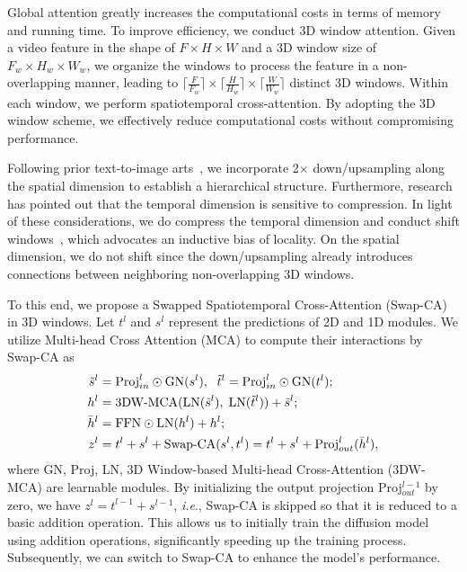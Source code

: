 \documentclass{article}
\def\ie{\emph{i.e}.} \def\Ie{\emph{I.e}.}
\begin{document}
Global attention greatly increases the computational costs in terms of memory and running time. 
To improve efficiency, we conduct 3D window attention.
Given a video feature in the shape of $F\times H \times W$ and a 3D window size of $F_w \times H_w \times W_w$, we organize the windows to process the feature in a non-overlapping manner, leading to $\lceil \frac{F}{F_w} \rceil \times \lceil \frac{H}{H_w} \rceil \times \lceil \frac{W}{W_w} \rceil$ distinct 3D windows.
Within each window, we perform spatiotemporal cross-attention. By adopting the 3D window scheme, we effectively reduce computational costs without compromising performance.



Following prior text-to-image arts~\cite{VideoLDM, 2022LDM}, we incorporate 2$\times$ down/upsampling along the spatial dimension to establish a hierarchical structure.
Furthermore, research~\cite{2019VideoCompression,2020VideoCompression} has pointed out that the temporal dimension is sensitive to compression.
In light of these considerations, we do compress the temporal dimension and conduct shift windows~\cite{2022VideoSwin}, which advocates an inductive bias of locality.
On the spatial dimension, we do not shift since the down/upsampling already introduces connections between neighboring non-overlapping 3D windows.



To this end, we propose a Swapped Spatiotemporal Cross-Attention (Swap-CA) in 3D windows.
Let $t^l$ and $s^l$ represent the predictions of 2D and 1D modules. We utilize Multi-head Cross Attention (MCA) to compute their interactions by Swap-CA as
\begin{equation}
\begin{aligned}
    \Tilde{s}^l & = \text{Proj}^l_{in} \odot \text{GN}(s^l), \ \;  \Tilde{t}^l = \text{Proj}^l_{in}\odot \text{GN}(t^l); \\
    h^l &= \text{3DW-MCA}(\text{LN}(\Tilde{s}^l), \; \text{LN}(\Tilde{t}^l)) + \Tilde{s}^l; \\
    \bar{h}^l &= \text{FFN} \odot \text{LN} (h^l) + h^l; \\
    z^l &= t^l + s^l + \text{Swap-CA}(s^l, t^l) = t^l + s^l + \text{Proj}^l_{out}(\bar{h}^l),
\end{aligned}
\label{eq:first_layer}
\end{equation}
where GN, Proj, LN, 3D Window-based Multi-head Cross-Attention (3DW-MCA) are learnable modules.
By initializing the output projection Proj$^{l-1}_{out}$ by zero, we have $z^l = t^{l-1} + s^{l-1}$, \ie, Swap-CA is skipped so that it is reduced to a basic addition operation.
This allows us to initially train the diffusion model using addition operations, significantly speeding up the training process.
Subsequently, we can switch to Swap-CA to enhance the model's performance.
\end{document}
